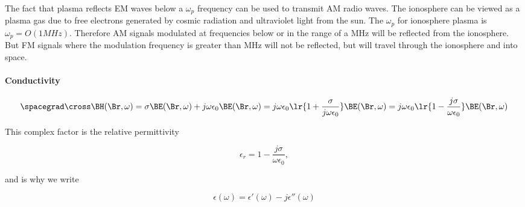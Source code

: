 The fact that plasma reflects EM waves below a \( \omega_p \) frequency can be used to transmit AM radio waves.  The ionosphere can be viewed as a plasma gas due to free electrons generated by cosmic radiation and ultraviolet light from the sun.  The \( \omega_p \) for ionosphere plasma is \( \omega_p = O(1 \si{MHz}) \).  Therefore AM signals modulated at frequencies below or in the range of a \si{MHz} will be reflected from the ionosphere.  But FM signals where the modulation frequency is greater than \si{MHz} will not be reflected, but will travel through the ionosphere and into space.

\paragraph{Conductivity}


\begin{dmath}\label{eqn:druid:260}
\spacegrad \cross \BH(\Br, \omega)
= \sigma \BE(\Br, \omega) + j \omega \epsilon_0 \BE(\Br, \omega)
= j \omega \epsilon_0 \lr{ 1 + \frac{\sigma}{j \omega \epsilon_0} } \BE(\Br, \omega)
= j \omega \epsilon_0 \lr{ 1 - \frac{j \sigma}{\omega \epsilon_0} } \BE(\Br, \omega)
\end{dmath}

This complex factor is the relative permittivity

\begin{dmath}\label{eqn:druid:280}
\epsilon_r
= 1 - \frac{j \sigma}{\omega \epsilon_0},
\end{dmath}

and is why we write

\begin{dmath}\label{eqn:druid:300}
\epsilon(\omega) = \epsilon'(\omega) - j \epsilon''(\omega)
\end{dmath}

